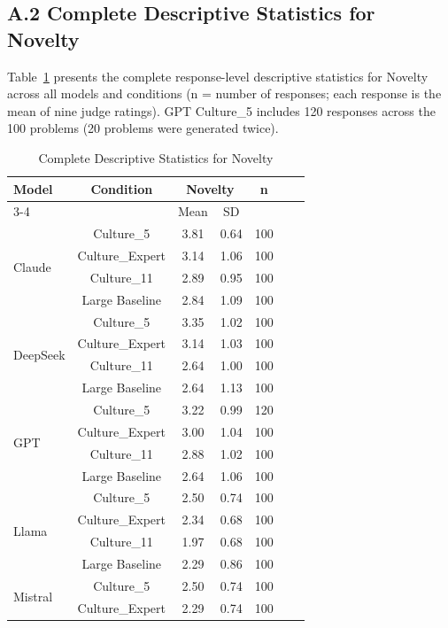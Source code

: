 \documentclass{article}
\begin{document}
\subsection*{A.2 Complete Descriptive Statistics for Novelty}

Table~\ref{tab:desc_novelty_full} presents the complete response-level descriptive statistics for Novelty across all models and conditions (n = number of responses; each response is the mean of nine judge ratings). GPT Culture\_5 includes 120 responses across the 100 problems (20 problems were generated twice).

\begin{table}[H]
\centering
\caption{Complete Descriptive Statistics for Novelty}
\label{tab:desc_novelty_full}
\begin{tabular}{lcccccc}
\toprule
\multirow{2}{*}{Model} & \multirow{2}{*}{Condition} & \multicolumn{2}{c}{Novelty} & \multirow{2}{*}{n} \\
\cmidrule(lr){3-4}
 & & Mean & SD & \\
\midrule
\multirow{4}{*}{Claude} & Culture\_5 & 3.81 & 0.64 & 100 \\
 & Culture\_Expert & 3.14 & 1.06 & 100 \\
 & Culture\_11 & 2.89 & 0.95 & 100 \\
 & Large Baseline & 2.84 & 1.09 & 100 \\
\midrule
\multirow{4}{*}{DeepSeek} & Culture\_5 & 3.35 & 1.02 & 100 \\
 & Culture\_Expert & 3.14 & 1.03 & 100 \\
 & Culture\_11 & 2.64 & 1.00 & 100 \\
 & Large Baseline & 2.64 & 1.13 & 100 \\
\midrule
\multirow{4}{*}{GPT} & Culture\_5 & 3.22 & 0.99 & 120 \\
 & Culture\_Expert & 3.00 & 1.04 & 100 \\
 & Culture\_11 & 2.88 & 1.02 & 100 \\
 & Large Baseline & 2.64 & 1.06 & 100 \\
\midrule
\multirow{4}{*}{Llama} & Culture\_5 & 2.50 & 0.74 & 100 \\
 & Culture\_Expert & 2.34 & 0.68 & 100 \\
 & Culture\_11 & 1.97 & 0.68 & 100 \\
 & Large Baseline & 2.29 & 0.86 & 100 \\
\midrule
\multirow{4}{*}{Mistral} & Culture\_5 & 2.50 & 0.74 & 100 \\
 & Culture\_Expert & 2.29 & 0.74 & 100 \\

\end{tabular}
\end{table}
\end{document}
